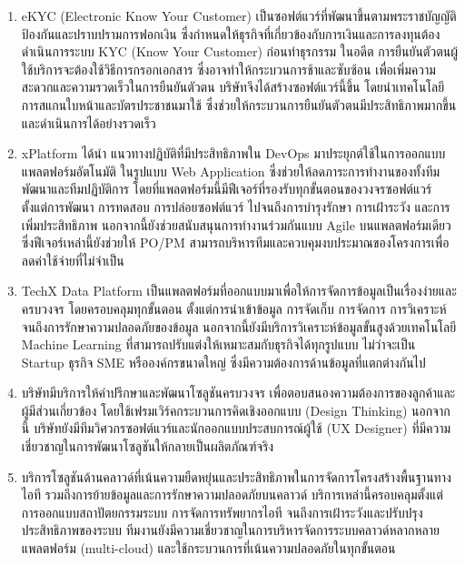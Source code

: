 \begin{enumerate}
  \item eKYC (Electronic Know Your Customer) เป็นซอฟต์แวร์ที่พัฒนาขึ้นตามพระราชบัญญัติป้องกันและปราบปรามการฟอกเงิน ซึ่งกำหนดให้ธุรกิจที่เกี่ยวข้องกับการเงินและการลงทุนต้องดำเนินการระบบ KYC (Know Your Customer) ก่อนทำธุรกรรม ในอดีต การยืนยันตัวตนผู้ใช้บริการจะต้องใช้วิธีการกรอกเอกสาร ซึ่งอาจทำให้กระบวนการช้าและซับซ้อน เพื่อเพิ่มความสะดวกและความรวดเร็วในการยืนยันตัวตน บริษัทจึงได้สร้างซอฟต์แวร์นี้ขึ้น โดยนำเทคโนโลยีการสแกนใบหน้าและบัตรประชาชนมาใช้ ซึ่งช่วยให้กระบวนการยืนยันตัวตนมีประสิทธิภาพมากขึ้นและดำเนินการได้อย่างรวดเร็ว
  \item xPlatform ได้นำ แนวทางปฏิบัติที่มีประสิทธิภาพใน DevOps มาประยุกต์ใช้ในการออกแบบแพลตฟอร์มอัตโนมัติ  ในรูปแบบ Web Application ซึ่งช่วยให้ลดภาระการทำงานของทั้งทีมพัฒนาและทีมปฏิบัติการ โดยที่แพลตฟอร์มนี้มีฟีเจอร์ที่รองรับทุกขั้นตอนของวงจรซอฟต์แวร์ ตั้งแต่การพัฒนา การทดสอบ การปล่อยซอฟต์แวร์ ไปจนถึงการบำรุงรักษา การเฝ้าระวัง และการเพิ่มประสิทธิภาพ นอกจากนี้ยังช่วยสนับสนุนการทำงานร่วมกันแบบ Agile บนแพลตฟอร์มเดียว ซึ่งฟีเจอร์เหล่านี้ยังช่วยให้ PO/PM สามารถบริหารทีมและควบคุมงบประมาณของโครงการเพื่อลดค่าใช้จ่ายที่ไม่จำเป็น
  \item TechX Data Platform เป็นแพลตฟอร์มที่ออกแบบมาเพื่อให้การจัดการข้อมูลเป็นเรื่องง่ายและครบวงจร โดยครอบคลุมทุกขั้นตอน ตั้งแต่การนำเข้าข้อมูล การจัดเก็บ การจัดการ การวิเคราะห์ จนถึงการรักษาความปลอดภัยของข้อมูล นอกจากนี้ยังมีบริการวิเคราะห์ข้อมูลขั้นสูงด้วยเทคโนโลยี Machine Learning ที่สามารถปรับแต่งให้เหมาะสมกับธุรกิจได้ทุกรูปแบบ ไม่ว่าจะเป็น Startup ธุรกิจ SME หรือองค์กรขนาดใหญ่ ซึ่งมีความต้องการด้านข้อมูลที่แตกต่างกันไป
  \item บริษัทมีบริการให้คำปรึกษาและพัฒนาโซลูชันครบวงจร เพื่อตอบสนองความต้องการของลูกค้าและผู้มีส่วนเกี่ยวข้อง โดยใช้เฟรมเวิร์คกระบวนการคิดเชิงออกแบบ (Design Thinking) นอกจากนี้ บริษัทยังมีทีมวิศวกรซอฟต์แวร์และนักออกแบบประสบการณ์ผู้ใช้ (UX Designer) ที่มีความเชี่ยวชาญในการพัฒนาโซลูชันให้กลายเป็นผลิตภัณฑ์จริง
  \item บริการโซลูชันด้านคลาวด์ที่เน้นความยืดหยุ่นและประสิทธิภาพในการจัดการโครงสร้างพื้นฐานทางไอที รวมถึงการย้ายข้อมูลและการรักษาความปลอดภัยบนคลาวด์ บริการเหล่านี้ครอบคลุมตั้งแต่การออกแบบสถาปัตยกรรมระบบ การจัดการทรัพยากรไอที จนถึงการเฝ้าระวังและปรับปรุงประสิทธิภาพของระบบ ทีมงานยังมีความเชี่ยวชาญในการบริหารจัดการระบบคลาวด์หลากหลายแพลตฟอร์ม (multi-cloud) และใช้กระบวนการที่เน้นความปลอดภัยในทุกขั้นตอน
\end{enumerate}

\renewcommand{\arraystretch}{1.2}
\newcommand{\attr}[1]{\hspace{2pt}#1\hspace{2pt}}

